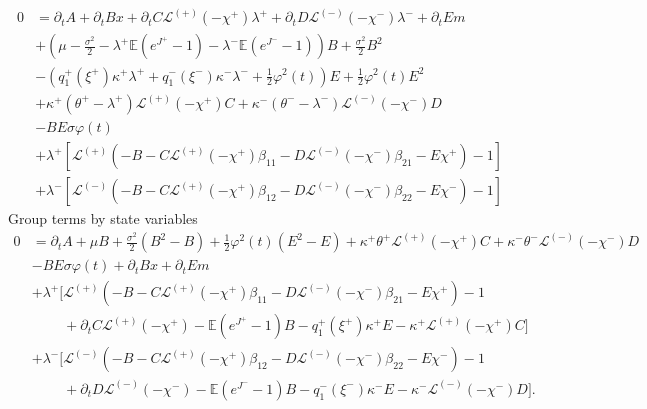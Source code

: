 \documentclass[11pt,a4paper]{article}
\numberwithin{equation}{section}
\theoremstyle{remark}
\theoremstyle{definition}
\newcommand{\E}{{\mathbb{E}}}
\begin{document}
\begin{align*}
    0 & =\partial_t A+ \partial_t B x +\partial_t C \mathcal{L}^{(+)}\left(-\chi^{+}\right) \lambda^{+}+\partial_t D \mathcal{L}^{(-)}\left(-\chi^{-}\right) \lambda^{-}+\partial_t E m \\
    &+\left(\mu-\frac{\sigma^2}{2}-\lambda^+\E\left(e^{J^+}-1\right)-\lambda^-\E\left(e^{J^-}-1\right)\right)B+\frac{\sigma^2}{2}B^2\\
    & -\left(q_1^{+}\left(\xi^{+}\right) \kappa^{+} \lambda^{+}+q_1^{-}\left(\xi^{-}\right) \kappa^{-} \lambda^{-}+\frac{1}{2} \varphi^2(t)\right) E+\frac{1}{2} \varphi^2(t) E^2 \\
    & +\kappa^{+}\left(\theta^{+}-\lambda^{+}\right) \mathcal{L}^{(+)}\left(-\chi^{+}\right) C+\kappa^{-}\left(\theta^{-}-\lambda^{-}\right) \mathcal{L}^{(-)}\left(-\chi^{-}\right) D \\
    &-BE\sigma\varphi(t)\\
    & +\lambda^{+}\left[\mathcal{L}^{(+)}\left(-B-C \mathcal{L}^{(+)}\left(-\chi^{+}\right) \beta_{11}-D \mathcal{L}^{(-)}\left(-\chi^{-}\right) \beta_{21}-E \chi^{+}\right)-1\right] \\
    & +\lambda^{-}\left[\mathcal{L}^{(-)}\left(-B-C \mathcal{L}^{(+)}\left(-\chi^{+}\right) \beta_{12}-D \mathcal{L}^{(-)}\left(-\chi^{-}\right) \beta_{22}-E \chi^{-}\right)-1\right]
\end{align*}
Group terms by state variables
\begin{align*}
    0 & =\partial_t A+ \mu B + \frac{\sigma^2}{2}(B^2-B)+ \frac{1}{2}\varphi^2(t)(E^2-E)+\kappa^+\theta^+\mathcal{L}^{(+)}(-\chi^+)C+\kappa^-\theta^-\mathcal{L}^{(-)}(-\chi^-)D\\
    &- BE\sigma\varphi(t) +\partial_t B x %
    +\partial_t E m \\
    & +\lambda^{+}\Big[\mathcal{L}^{(+)}\left(-B-C \mathcal{L}^{(+)}\left(-\chi^{+}\right) \beta_{11}-D \mathcal{L}^{(-)}\left(-\chi^{-}\right) \beta_{21}-E \chi^{+}\right)-1\\
    &\phantom{+\lambda^{+}\Big[} +\partial_t C\mathcal{L}^{(+)}(-\chi^+)
    -\E\left(e^{J^+}-1\right)B-q^+_1(\xi^+)\kappa^+E-\kappa^+\mathcal{L}^{(+)}(-\chi^+)C
    \Big] \\
    & +\lambda^{-}\Big[\mathcal{L}^{(-)}\left(-B-C \mathcal{L}^{(+)}\left(-\chi^{+}\right) \beta_{12}-D \mathcal{L}^{(-)}\left(-\chi^{-}\right) \beta_{22}-E \chi^{-}\right)-1\\
    &\phantom{+\lambda^{+}\Big[} +\partial_t D\mathcal{L}^{(-)}(-\chi^-)
    -\E\left(e^{J^-}-1\right)B-q^-_1(\xi^-)\kappa^-E-\kappa^-\mathcal{L}^{(-)}(-\chi^-)D
    \Big].
\end{align*}
\end{document}
